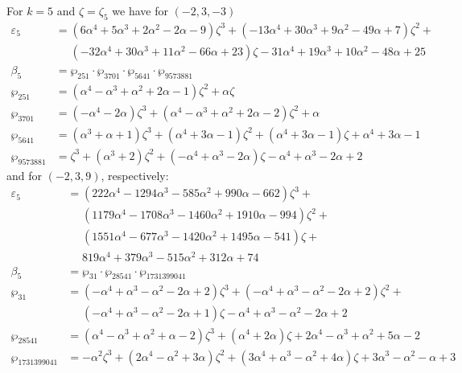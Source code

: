 \documentclass[12pt]{amsart}
\theoremstyle{definition}
\def\a{\alpha}
\def\z{\zeta}
\def\z{\zeta}
\begin{document}
\noindent 
For $k=5$ and $\zeta=\zeta_5$ we have for $(-2,3,-3)$
{\small
\begin{align*}
\varepsilon_{5} &= 
(6 \a^4 + 5 \a^3 + 2 \a^2 - 2 \a - 9) \z^3 + (-13 \a^4 + 30 \a^3 + 9 \a^2 - 49 \a + 7) \z^2 + 
\\ & \quad\,\,
(-32 \a^4 + 30 \a^3 + 11 \a^2 - 66 \a + 23) \z - 31 \a^4 + 19 \a^3 + 10 \a^2 - 48 \a + 25
\\
\beta_{5} &= \wp_{251} \cdot \wp_{3701} \cdot \wp_{5641}
\cdot \wp_{9573881} \\
\wp_{251} &=
(\a^4 - \a^3 + \a^2 + 2 \a - 1) \z^2 + \a \z
\\
\wp_{3701} &=
(-\a^4 - 2 \a) \z^3 + (\a^4 - \a^3 + \a^2 + 2 \a - 2) \z^2 + \a
\\
\wp_{5641} &=
(\a^3 + \a + 1) \z^3 + (\a^4 + 3 \a - 1) \z^2 + (\a^4 + 3 \a - 1) \z + \a^4 + 3 \a - 1
\\
\wp_{9573881} &=
\z^3 + (\a^3 + 2) \z^2 + (-\a^4 + \a^3 - 2 \a) \z - \a^4 + \a^3 - 2 \a + 2
\end{align*}
}
and for $(-2,3,9)$, respectively:
{\small
\begin{align*}
\varepsilon_{5} &= 
(222 \a^4 - 1294 \a^3 - 585 \a^2 + 990 \a - 662) \z^3 + 
\\ & \quad\,\,
(1179 \a^4 - 1708 \a^3 - 1460 \a^2 + 1910 \a - 994) \z^2 + 
\\ & \quad\,\,
(1551 \a^4 - 677 \a^3 - 1420 \a^2 + 1495 \a - 541) \z + 
\\ & \quad\,\,
819 \a^4 + 379 \a^3 - 515 \a^2 + 312 \a + 74
\\
\beta_{5} &= \wp_{31} \cdot \wp_{28541} \cdot \wp_{1731399041} \\
\wp_{31} &=
(-\a^4 + \a^3 - \a^2 - 2 \a + 2) \z^3 + (-\a^4 + \a^3 - \a^2 - 2 \a + 2) \z^2 + 
\\ & \quad\,\,
(-\a^4 + \a^3 - \a^2 - 2 \a + 1) \z - \a^4 + \a^3 - \a^2 - 2 \a + 2
\\
\wp_{28541} &=
(\a^4 - \a^3 + \a^2 + \a - 2) \z^3 + (\a^4 + 2 \a) \z + 2 \a^4 - \a^3 + \a^2 + 5 \a - 2
\\
\wp_{1731399041} &=
-\a^2 \z^3 + (2 \a^4 - \a^2 + 3 \a) \z^2 + (3 \a^4 + \a^3 - \a^2 + 4 \a) \z + 3 \a^3 - \a^2 - \a + 3
\end{align*}
}
\end{document}
